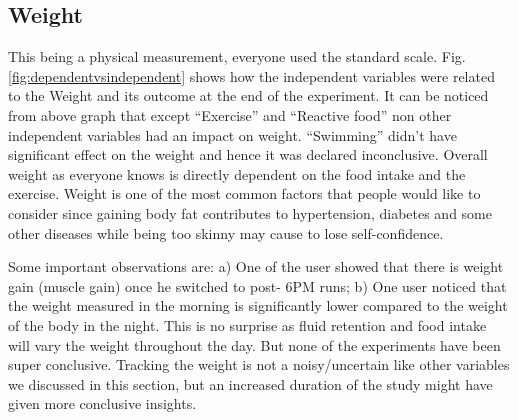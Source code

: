 \subsection{Weight}

This being a physical measurement, everyone used the standard scale. Fig.\ref{fig:dependentvsindependent} shows how the independent variables were related to the Weight and its outcome at the end of the experiment.
It can be noticed from above graph that except \enquote{Exercise} and \enquote{Reactive food} non other independent variables had an impact on weight. \enquote{Swimming} didn’t have significant effect on the weight and hence it was declared inconclusive. Overall weight as everyone knows is directly dependent on the food intake and the exercise. Weight is one of the most common factors that people would like to consider since gaining body fat contributes to hypertension, diabetes and some other diseases while being too skinny may cause to lose self-confidence. 

Some important observations are: a) One of the user showed that there is weight gain (muscle gain) once he switched to post- 6PM runs; b) One user noticed that the weight measured in the morning is significantly lower compared to the weight of the body in the night. This is no surprise as fluid retention and food intake will vary the weight throughout the day. But none of the experiments have been super conclusive. Tracking the weight is not a noisy/uncertain like other variables we discussed in this section, but an increased duration of the study might have given more conclusive insights.

